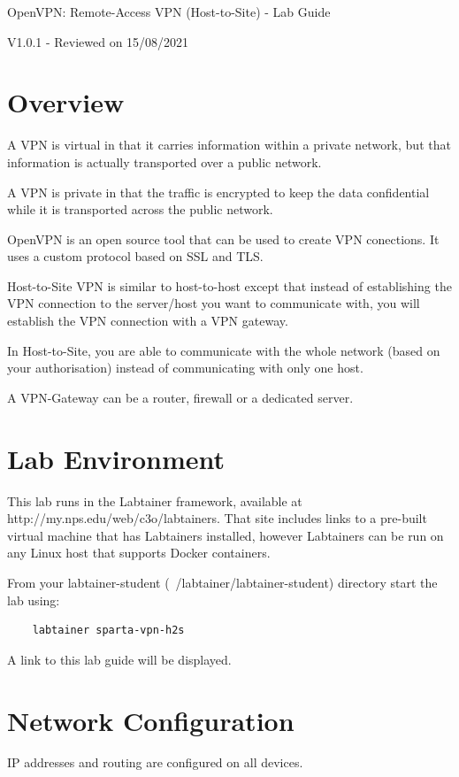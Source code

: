 


\begin{center}
{\LARGE OpenVPN: Remote-Access VPN (Host-to-Site) - Lab Guide}

V1.0.1 - Reviewed on 15/08/2021
\vspace{0.1in}\\
\end{center}

\copyrightnotice

\section{Overview}
A VPN is virtual in that it carries information within a private network, but that information is actually transported over a public network.

A VPN is private in that the traffic is encrypted to keep the data confidential while it is transported across the public network.

OpenVPN is an open source tool that can be used to create VPN conections. It uses a custom protocol based on SSL and TLS.

Host-to-Site VPN is similar to host-to-host except that instead of establishing the VPN connection to the server/host you want to communicate with, you will establish the VPN connection with a VPN gateway.

In Host-to-Site, you are able to communicate with the whole network (based on your authorisation) instead of communicating with only one host.

A VPN-Gateway can be a router, firewall or a dedicated server.

\section{Lab Environment}
This lab runs in the Labtainer framework,
available at http://my.nps.edu/web/c3o/labtainers.
That site includes links to a pre-built virtual machine
that has Labtainers installed, however Labtainers can
be run on any Linux host that supports Docker containers.

From your labtainer-student (~/labtainer/labtainer-student) directory start the lab using:
\begin{verbatim}
    labtainer sparta-vpn-h2s
\end{verbatim}
\noindent A link to this lab guide will be displayed.

\section{Network Configuration}
IP addresses and routing are configured on all devices.

